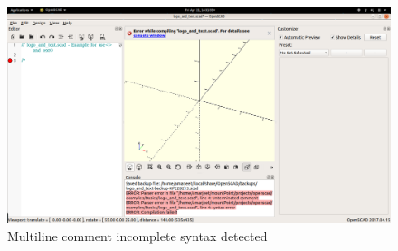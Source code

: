 \begin{itemize}
	\begin{figure}
		\centering
		\includegraphics[width=\linewidth]{images/output/grammer_comment_new.png}
		\caption{Multiline comment incomplete syntax detected}
		\label{fig:comment_new}
	\end{figure}
\end{itemize}
